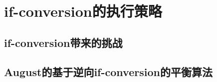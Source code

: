 \section{if-conversion的执行策略}

\subsection{if-conversion带来的挑战}
\subsection{August的基于逆向if-conversion的平衡算法}
